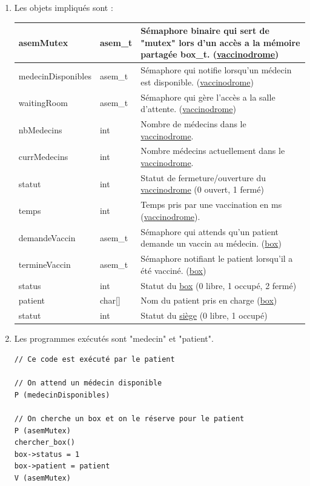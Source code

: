 \documentclass[a4paper]{article}
\begin{document}
  \begin{enumerate}
    \item Les objets impliqués sont :

    \begin{tabularx}{\linewidth}{|l|l|>{\strut}X|}
      \hline%
      asemMutex & asem\_t & Sémaphore binaire qui sert de "mutex" lors d'un accès a la mémoire partagée box\_t. (\underline{vaccinodrome}) \\ \hline%
      medecinDisponibles & asem\_t & Sémaphore qui notifie lorsqu'un médecin est disponible. (\underline{vaccinodrome}) \\ \hline%
      waitingRoom & asem\_t & Sémaphore qui gère l'accès a la salle d'attente. (\underline{vaccinodrome}) \\ \hline%
      nbMedecins & int & Nombre de médecins dans le \underline{vaccinodrome}. \\ \hline%
      currMedecins & int & Nombre médecins actuellement dans le \underline{vaccinodrome}. \\ \hline%
      statut & int & Statut de fermeture/ouverture du \underline{vaccinodrome} (0 ouvert, 1 fermé) \\ \hline%
      temps & int & Temps pris par une vaccination en ms (\underline{vaccinodrome}). \\ \hline%

      demandeVaccin & asem\_t & Sémaphore qui attends qu'un patient demande un vaccin au médecin. (\underline{box}) \\ \hline%
      termineVaccin & asem\_t & Sémaphore notifiant le patient lorsqu'il a été vacciné. (\underline{box}) \\ \hline%
      status & int & Statut du \underline{box} (0 libre, 1 occupé, 2 fermé) \\ \hline%
      patient & char[] & Nom du patient pris en charge (\underline{box})\\ \hline%
      statut & int & Statut du \underline{siège} (0 libre, 1 occupé) \\ \hline%
    \end{tabularx}

    \item Les programmes exécutés sont "medecin" et "patient".

    \begin{verbatim}
// Ce code est exécuté par le patient

// On attend un médecin disponible
P (medecinDisponibles)

// On cherche un box et on le réserve pour le patient
P (asemMutex)
chercher_box()
box->status = 1
box->patient = patient
V (asemMutex)


\end{verbatim}
\end{enumerate}
\end{document}
